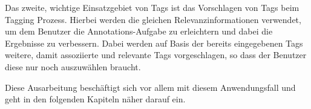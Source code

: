 Das zweite, wichtige Einsatzgebiet von Tags ist das Vorschlagen von Tags beim Tagging Prozess. Hierbei werden die gleichen Relevanzinformationen verwendet, um dem Benutzer die Annotations-Aufgabe zu erleichtern und dabei die Ergebnisse zu verbessern. Dabei werden auf Basis der bereits eingegebenen Tags weitere, damit assoziierte und relevante Tags vorgeschlagen, so dass der Benutzer diese nur noch auszuwählen braucht.

Diese Ausarbeitung beschäftigt sich vor allem mit diesem Anwendungsfall und geht in den folgenden Kapiteln näher darauf ein.




% 
